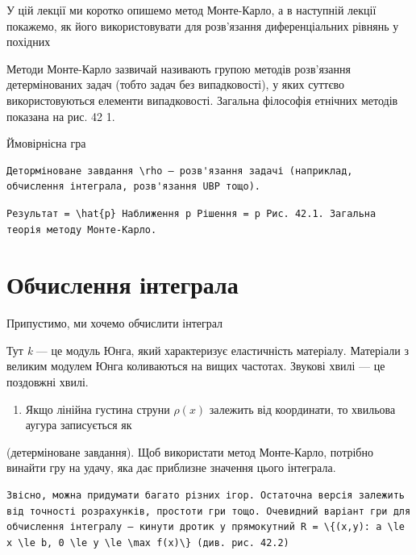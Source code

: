 \documentclass[
  ukrainian,
]{article}
\providecommand{\tightlist}{%
  \setlength{\itemsep}{0pt}\setlength{\parskip}{0pt}}
\begin{document}
У цій лекції ми коротко опишемо метод Монте-Карло, а в наступній лекції
покажемо, як його використовувати для розв'язання диференціальних
рівнянь у похідних

Методи Монте-Карло зазвичай називають групою методів розв'язання
детермінованих задач (тобто задач без випадковості), у яких суттєво
використовуються елементи випадковості. Загальна філософія етнічних
методів показана на рис. 42 1.

Ймовірнісна гра

\begin{verbatim}
Деторміноване завдання \rho — розв'язання задачі (наприклад, обчислення інтеграла, розв'язання UBP тощо).
\end{verbatim}

\begin{verbatim}
Результат = \hat{p} Наближення p Рішення = p Рис. 42.1. Загальна теорія методу Монте-Карло.
\end{verbatim}

\section{Обчислення
інтеграла}\label{ux43eux431ux447ux438ux441ux43bux435ux43dux43dux44f-ux456ux43dux442ux435ux433ux440ux430ux43bux430}

Припустимо, ми хочемо обчислити інтеграл

Тут \emph{k} --- це модуль Юнга, який характеризує еластичність
матеріалу. Матеріали з великим модулем Юнга коливаються на вищих
частотах. Звукові хвилі --- це поздовжні хвилі.

\begin{enumerate}
\def\labelenumi{\arabic{enumi}.}
\setcounter{enumi}{1}
\tightlist
\item
  Якщо лінійна густина струни \(\rho(x)\) залежить від координати, то
  хвильова аугура записується як
\end{enumerate}

(детерміноване завдання). Щоб використати метод Монте-Карло, потрібно
винайти гру на удачу, яка дає приблизне значення цього інтеграла.

\begin{verbatim}
Звісно, можна придумати багато різних ігор. Остаточна версія залежить від точності розрахунків, простоти гри тощо. Очевидний варіант гри для обчислення інтегралу — кинути дротик у прямокутний R = \{(x,y): a \le x \le b, 0 \le y \le \max f(x)\} (див. рис. 42.2)
\end{verbatim}
\end{document}
